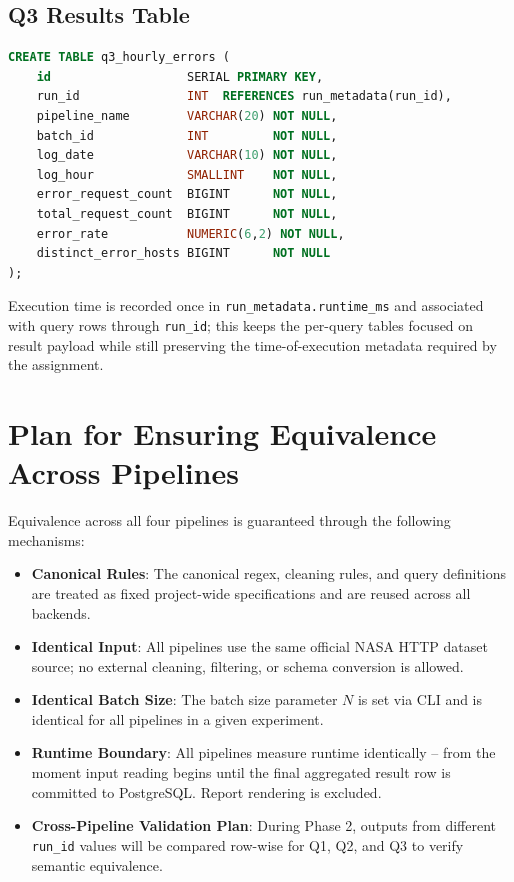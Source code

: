 \documentclass[12pt,a4paper]{article}
\begin{document}
\subsection{Q3 Results Table}
\begin{lstlisting}[language=SQL]
CREATE TABLE q3_hourly_errors (
    id                   SERIAL PRIMARY KEY,
    run_id               INT  REFERENCES run_metadata(run_id),
    pipeline_name        VARCHAR(20) NOT NULL,
    batch_id             INT         NOT NULL,
    log_date             VARCHAR(10) NOT NULL,
    log_hour             SMALLINT    NOT NULL,
    error_request_count  BIGINT      NOT NULL,
    total_request_count  BIGINT      NOT NULL,
    error_rate           NUMERIC(6,2) NOT NULL,
    distinct_error_hosts BIGINT      NOT NULL
);
\end{lstlisting}

Execution time is recorded once in \texttt{run\_metadata.runtime\_ms} and associated with query rows through \texttt{run\_id}; this keeps the per-query tables focused on result payload while still preserving the time-of-execution metadata required by the assignment.

\section{Plan for Ensuring Equivalence Across Pipelines}
Equivalence across all four pipelines is guaranteed through the following mechanisms:

\begin{itemize}
    \item \textbf{Canonical Rules}: The canonical regex, cleaning rules, and query definitions are treated as fixed project-wide specifications and are reused across all backends.
    \item \textbf{Identical Input}: All pipelines use the same official NASA HTTP dataset source; no external cleaning, filtering, or schema conversion is allowed.
    \item \textbf{Identical Batch Size}: The batch size parameter $N$ is set via CLI and is identical for all pipelines in a given experiment.
    \item \textbf{Runtime Boundary}: All pipelines measure runtime identically -- from the moment input reading begins until the final aggregated result row is committed to PostgreSQL. Report rendering is excluded.
    \item \textbf{Cross-Pipeline Validation Plan}: During Phase 2, outputs from different \texttt{run\_id} values will be compared row-wise for Q1, Q2, and Q3 to verify semantic equivalence.
\end{itemize}
\end{document}
